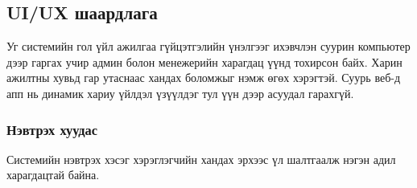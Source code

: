 \subsection{UI/UX шаардлага}
Уг системийн гол үйл ажилгаа гүйцэтгэлийн үнэлгээг ихэвчлэн суурин компьютер дээр гаргах учир админ болон
менежерийн харагдац үүнд тохирсон байх. Харин ажилтны хувьд гар утаснаас хандах боломжыг нэмж өгөх хэрэгтэй.
Суурь веб-д апп нь динамик хариу үйлдэл үзүүлдэг тул үүн дээр асуудал гарахгүй.

\subsubsection{Нэвтрэх хуудас}
Системийн нэвтрэх хэсэг хэрэглэгчийн хандах эрхээс үл шалтгаалж нэгэн адил харагдацтай байна.
